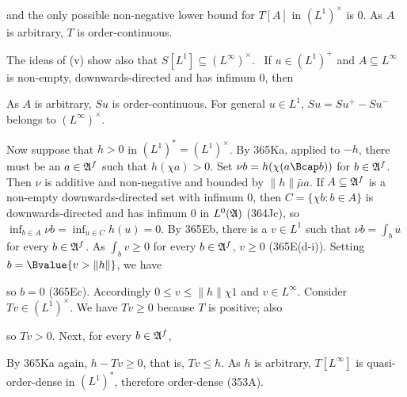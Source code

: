 {
     
\noindent and the only possible non-negative lower bound for $T[A]$ in
$(L^1)^{\times}$ is $0$.   As $A$ is arbitrary, $T$ is order-continuous.
     
\medskip
     
 The ideas of (v) show also that
$S[L^1]\subseteq(L^{\infty})^{\times}$.   \Prf\ If $u\in(L^1)^+$ and
$A\subseteq L^{\infty}$ is non-empty, downwards-directed and has infimum
$0$, then
     
     
\noindent As $A$ is arbitrary, $Su$ is order-continuous.   For general
$u\in L^1$, $Su=Su^+-Su^-$ belongs to $(L^{\infty})^{\times}$.\ \Qed
     
\medskip
     
 Now suppose that $h>0$ in $(L^1)^*=(L^1)^{\times}$.
By 365Ka, applied to $-h$, there must be an $a\in\frak A^f$ such that
$h(\chi a)>0$.   Set $\nu b=h(\chi(a\Bcap b))$ for
$b\in\frak A^f$.   Then $\nu$ is additive and non-negative and bounded
by $\|h\|\bar\mu a$.   If $A\subseteq\frak A^f$ is a non-empty
downwards-directed set with infimum $0$, then $C=\{\chi b:b\in A\}$ is
downwards-directed and has infimum $0$ in $L^0(\frak A)$ (364Jc), so
$\inf_{b\in A}\nu b=\inf_{u\in C}h(u)=0$.   By 365Eb, there is a
$v\in L^1$ such that
$\nu b=\int_bu$ for every $b\in\frak A^f$.   As $\int_bv\ge 0$ for every
$b\in\frak A^f$, $v\ge 0$ (365E(d-i)).   Setting $b=\Bvalue{v>\|h\|}$,
we have
     
     
\noindent so $b=0$ (365Ec).   Accordingly $0\le v\le\|h\|\chi 1$ and
$v\in L^{\infty}$.   Consider $Tv\in(L^1)^{\times}$.   We have
$Tv\ge 0$ because $T$ is positive;  also
     
     
\noindent so $Tv>0$.   Next, for every $b\in\frak A^f$,
     
     
\noindent By 365Ka again, $h-Tv\ge 0$, that is, $Tv\le h$.   As $h$ is
arbitrary, $T[L^{\infty}]$ is quasi-order-dense in $(L^1)^*$, therefore
order-dense (353A).
     
\medskip
     
}
